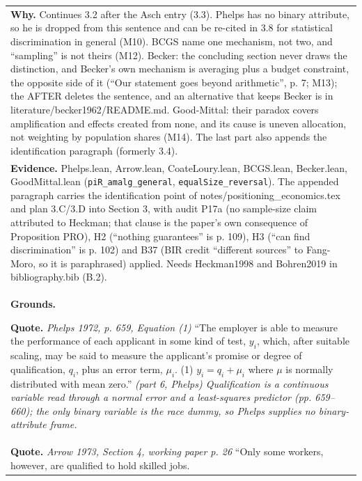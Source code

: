 \documentclass[10pt]{article}
\theoremstyle{definition}
\newlength{\fullw}\setlength{\fullw}{25.9cm}
\begin{document}
{\begin{longtable}{|p{0.9cm}|p{12.2cm}|p{12.2cm}|}
\multicolumn{3}{|p{\fullw}|}{\textbf{Why.} Continues 3.2 after the Asch entry (3.3). Phelps has no binary attribute, so he is dropped from this sentence and can be re-cited in 3.8 for statistical discrimination in general (M10). BCGS name one mechanism, not two, and ``sampling'' is not theirs (M12). Becker: the concluding section never draws the distinction, and Becker's own mechanism is averaging plus a budget constraint, the opposite side of it (``Our statement goes beyond arithmetic'', p. 7; M13); the AFTER deletes the sentence, and an alternative that keeps Becker is in literature/becker1962/README.md. Good-Mittal: their paradox covers amplification and effects created from none, and its cause is uneven allocation, not weighting by population shares (M14). The last part also appends the identification paragraph (formerly 3.4).} \\
\multicolumn{3}{|p{\fullw}|}{\textbf{Evidence.} Phelps.lean, Arrow.lean, CoateLoury.lean, BCGS.lean, Becker.lean, GoodMittal.lean (\texttt{piR\_amalg\_general}, \texttt{equalSize\_reversal}). The appended paragraph carries the identification point of notes/positioning\_economics.tex and plan 3.C/3.D into Section 3, with audit P17a (no sample-size claim attributed to Heckman; that clause is the paper's own consequence of Proposition PRO), H2 (``nothing guarantees'' is p. 109), H3 (``can find discrimination'' is p. 102) and B37 (BIR credit ``different sources'' to Fang-Moro, so it is paraphrased) applied. Needs Heckman1998 and Bohren2019 in bibliography.bib (B.2).} \\ \hline
\multicolumn{3}{|p{\fullw}|}{\textbf{Grounds.}\par \textbf{Quote.} \textit{Phelps 1972, p. 659, Equation (1)} \newline ``The employer is able to measure the performance of each
applicant in some kind of test, $y_i$, which, after suitable scaling, may be
said to measure the applicant's promise or degree of qualification, $q_i$,
plus an error term, $\mu_i$. (1) $y_i = q_i + \mu_i$ where $\mu$ is normally
distributed with mean zero.'' \newline \textit{(part 6, Phelps) Qualification is a continuous variable read
through a normal error and a least-squares predictor (pp. 659--660); the only
binary variable is the race dummy, so Phelps supplies no binary-attribute
frame.}} \\
\multicolumn{3}{|p{\fullw}|}{\textbf{Quote.} \textit{Arrow 1973, Section 4, working paper p. 26} \newline ``Only some workers, however, are qualified to hold skilled jobs.
}
\end{longtable}}
\end{document}
